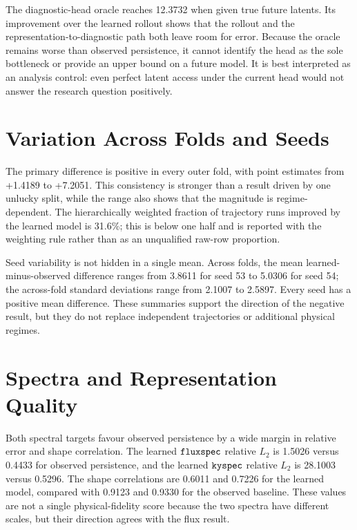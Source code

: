 The diagnostic-head oracle reaches 12.3732 when given true future latents. Its improvement over
the learned rollout shows that the rollout and the representation-to-diagnostic path both leave
room for error. Because the oracle remains worse than observed persistence, it cannot identify the
head as the sole bottleneck or provide an upper bound on a future model. It is best interpreted as
an analysis control: even perfect latent access under the current head would not answer the
research question positively.

\section{Variation Across Folds and Seeds}

The primary difference is positive in every outer fold, with point estimates from +1.4189 to
+7.2051. This consistency is stronger than a result driven by one unlucky split, while the range
also shows that the magnitude is regime-dependent. The hierarchically weighted fraction of
trajectory runs improved by the learned model is 31.6\%; this is below one half and is reported
with the weighting rule rather than as an unqualified raw-row proportion.

Seed variability is not hidden in a single mean. Across folds, the mean learned-minus-observed
difference ranges from 3.8611 for seed 53 to 5.0306 for seed 54; the across-fold standard
deviations range from 2.1007 to 2.5897. Every seed has a positive mean difference. These summaries
support the direction of the negative result, but they do not replace independent trajectories or
additional physical regimes.

\section{Spectra and Representation Quality}

Both spectral targets favour observed persistence by a wide margin in relative error and shape
correlation. The learned $\texttt{fluxspec}$ relative $L_2$ is 1.5026 versus 0.4433 for observed
persistence, and the learned $\texttt{kyspec}$ relative $L_2$ is 28.1003 versus 0.5296. The shape
correlations are 0.6011 and 0.7226 for the learned model, compared with 0.9123 and 0.9330 for the
observed baseline. These values are not a single physical-fidelity score because the two spectra
have different scales, but their direction agrees with the flux result.

